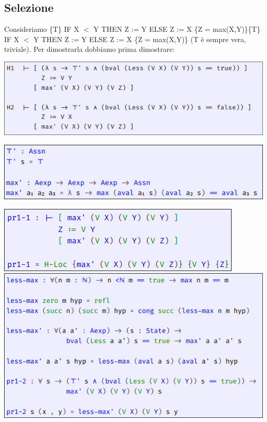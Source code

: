 
\subsection{Selezione}

Consideriamo \{T\} IF X $<$ Y THEN Z := Y ELSE Z := X \{Z = max(X,Y)\}\{T\} IF X $<$ Y THEN Z := Y ELSE Z := X \{Z = max(X,Y)\} (T è sempre vera, triviale). Per dimostrarla dobbiamo prima dimostrare:

\begin{center}
  \includegraphics[scale = 0.5]{images/IMP/Ipotesi}
\end{center}

\begin{center}
  \includegraphics[scale = 0.5]{images/IMP/T-max}
\end{center}


\begin{center}
  \includegraphics[scale = 0.4]{images/IMP/pr1-1}
  \includegraphics[scale = 0.4]{images/IMP/pr1-2}
\end{center}

